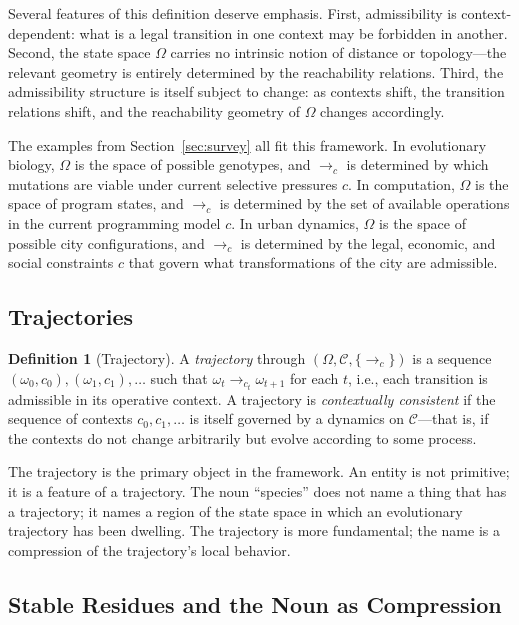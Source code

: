 \documentclass[12pt, a4paper]{article}
\theoremstyle{plain}
\theoremstyle{definition}
\newtheorem{definition}[theorem]{Definition}
\theoremstyle{remark}
\begin{document}
Several features of this definition deserve emphasis. First, admissibility
is context-dependent: what is a legal transition in one context may be
forbidden in another. Second, the state space $\Omega$ carries no intrinsic
notion of distance or topology---the relevant geometry is entirely determined
by the reachability relations. Third, the admissibility structure is itself
subject to change: as contexts shift, the transition relations shift, and
the reachability geometry of $\Omega$ changes accordingly.

The examples from Section~\ref{sec:survey} all fit this framework. In
evolutionary biology, $\Omega$ is the space of possible genotypes, and
$\to_c$ is determined by which mutations are viable under current selective
pressures $c$. In computation, $\Omega$ is the space of program states,
and $\to_c$ is determined by the set of available operations in the current
programming model $c$. In urban dynamics, $\Omega$ is the space of possible
city configurations, and $\to_c$ is determined by the legal, economic, and
social constraints $c$ that govern what transformations of the city are
admissible.

\subsection{Trajectories}

\begin{definition}[Trajectory]
A \emph{trajectory} through $(\Omega, \mathcal{C}, \{\to_c\})$ is a sequence
$(\omega_0, c_0), (\omega_1, c_1), \ldots$ such that $\omega_t \to_{c_t}
\omega_{t+1}$ for each $t$, i.e., each transition is admissible in its
operative context. A trajectory is \emph{contextually consistent} if the
sequence of contexts $c_0, c_1, \ldots$ is itself governed by a dynamics
on $\mathcal{C}$---that is, if the contexts do not change arbitrarily but
evolve according to some process.
\end{definition}

The trajectory is the primary object in the framework. An entity is not
primitive; it is a feature of a trajectory. The noun ``species'' does not
name a thing that has a trajectory; it names a region of the state space
in which an evolutionary trajectory has been dwelling. The trajectory is
more fundamental; the name is a compression of the trajectory's local behavior.

\subsection{Stable Residues and the Noun as Compression}
\end{document}
